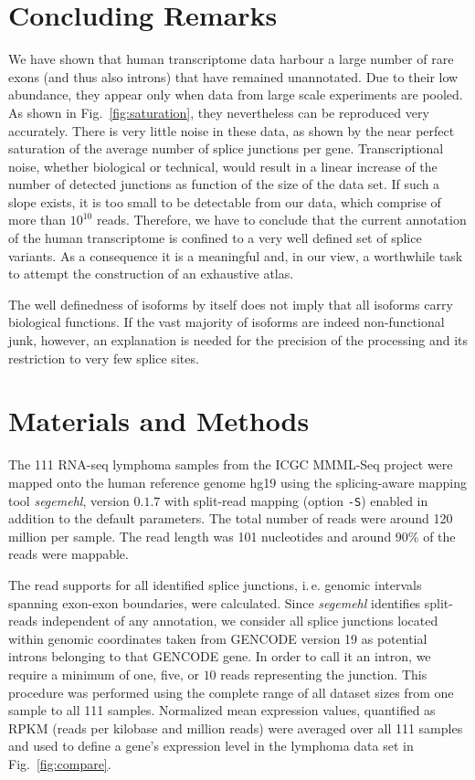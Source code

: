 \documentclass[ncrna,article,submit,moreauthors,pdftex,10pt,a4paper]{mdpi}
\begin{document}
\section{Concluding Remarks} 

We have shown that human transcriptome data harbour a large number of rare
exons (and thus also introns) that have remained unannotated. Due to their
low abundance, they appear only when data from large scale experiments are
pooled. As shown in Fig.~\ref{fig:saturation}, they nevertheless can be
reproduced very accurately. There is very little noise in these data, as
shown by the near perfect saturation of the average number of splice
junctions per gene. Transcriptional noise, whether biological or technical,
would result in a linear increase of the number of detected junctions as
function of the size of the data set. If such a slope exists, it is too
small to be detectable from our data, which comprise of more than $10^{10}$
reads. Therefore, we have to conclude that the current annotation of the human transcriptome is
confined to a very well defined set of splice variants. As a consequence it
is a meaningful and, in our view, a worthwhile task to attempt the
construction of an exhaustive atlas.

The well definedness of isoforms by itself does not imply that all isoforms
carry biological functions. If the vast majority of isoforms are indeed
non-functional junk, however, an explanation is needed for the precision of
the processing and its restriction to very few splice sites.

\section{Materials and Methods}

The 111 RNA-seq lymphoma samples from the ICGC MMML-Seq project
\cite{Richter:12a} were mapped onto the human reference genome hg19 using
the splicing-aware mapping tool \textit{segemehl}, version $0.1.7$
\cite{Hoffmann:09a,Hoffmann:14a} with split-read mapping (option
\texttt{-S}) enabled in addition to the default parameters. The total
number of reads were around 120 million per sample. The read length was 101 nucleotides
and around 90\% of the reads were mappable.

The read supports for all identified splice junctions, i.\,e. genomic
intervals spanning exon-exon boundaries, were calculated. Since
\textit{segemehl} identifies split-reads independent of any annotation,
we consider all splice junctions located within genomic coordinates taken
from GENCODE version 19 as potential introns belonging to that GENCODE
gene. In order to call it an intron, we require a minimum of one, five, or
$10$ reads representing the junction.  This procedure was performed using
the complete range of all dataset sizes from one sample to all 111 samples.
Normalized mean expression values, quantified as RPKM (reads per kilobase
and million reads) were averaged over all 111 samples and used to define a
gene's expression level in the lymphoma data set in Fig.\ \ref{fig:compare}. 
\end{document}
